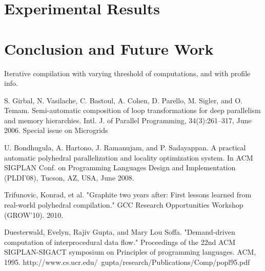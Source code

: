 \section{Experimental Results}

\section{Conclusion and Future Work}
Iterative compilation with varying threshold of computations, and with profile info.



S. Girbal, N. Vasilache, C. Bastoul, A. Cohen, D. Parello, M. Sigler, and O. Temam.
Semi-automatic composition of loop transformations for deep parallelism and memory
hierarchies. Intl. J. of Parallel Programming, 34(3):261–317, June 2006. Special issue on
Microgrids


U. Bondhugula, A. Hartono, J. Ramanujam, and P. Sadayappan. A practical automatic
polyhedral parallelization and locality optimization system. In ACM SIGPLAN Conf. on
Programming Languages Design and Implementation (PLDI’08), Tucson, AZ, USA, June
2008.

Trifunovic, Konrad, et al. "Graphite two years after: First lessons learned
from real-world polyhedral compilation."
GCC Research Opportunities Workshop (GROW'10). 2010.


Duesterwald, Evelyn, Rajiv Gupta, and Mary Lou Soffa. "Demand-driven computation of interprocedural data flow." Proceedings of the 22nd ACM SIGPLAN-SIGACT symposium on Principles of programming languages. ACM, 1995.
http://www.cs.ucr.edu/~gupta/research/Publications/Comp/popl95.pdf

